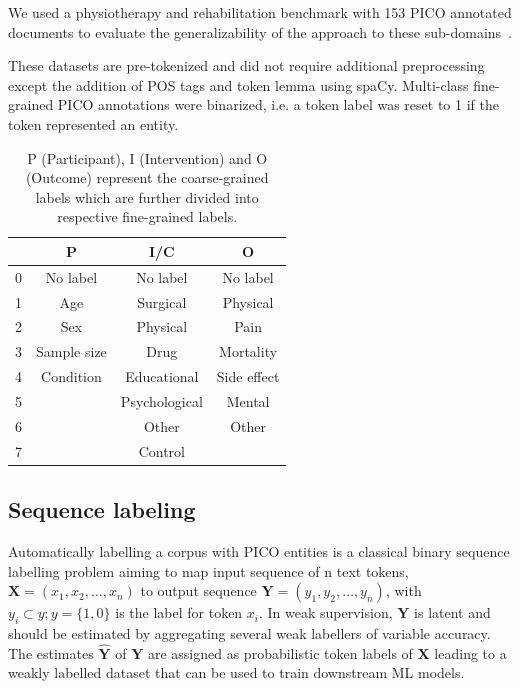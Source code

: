 \documentclass[10.7pt,]{article}
\begin{document}
We used a physiotherapy and rehabilitation benchmark with 153 PICO annotated documents to evaluate the generalizability of the approach to these sub-domains~\cite{dhrangadhariya2021end}.

These datasets are pre-tokenized and did not require additional preprocessing except the addition of POS tags and token lemma using spaCy.
Multi-class fine-grained PICO annotations were binarized, i.e. a token label was reset to 1 if the token represented an entity.
%
%
%
\begin{table}[h!]
\begin{center}
\begin{tabular}{| c | c | c | c |} 
\hline
 & P & I/C & O \\ 
\hline
0 & No label & No label & No label \\ 
1 & Age & Surgical & Physical \\ 
2 & Sex & Physical & Pain \\
3 & Sample size & Drug & Mortality \\
4 & Condition & Educational & Side effect \\
5 &  & Psychological & Mental \\
6 &  & Other & Other \\
7 &  & Control &  \\
\hline
\end{tabular}
\caption{\label{table:coarsefineconcept} P (Participant), I (Intervention) and O (Outcome) represent the coarse-grained labels which are further divided into respective fine-grained labels.}
\end{center}
\end{table}
%
%
%
\subsection{Sequence labeling}\label{seq_lab}
%
Automatically labelling a corpus with PICO entities is a classical binary sequence labelling problem aiming to map input sequence of n text tokens, $ \bm{X} = (x_{1}, x_{2}, \dotso , x_{n} )$ to output sequence $\bm{Y} = (y_{1}, y_{2}, \dotso , y_{n} )$, with $y_{i} \subset y; y = \{1,0\} $ is the label for token $x_{i}$.
In weak supervision, $\bm{Y}$ is latent and should be estimated by aggregating several weak labellers of variable accuracy.
The estimates $\bm{\hat{Y}}$ of $\bm{Y}$ are assigned as probabilistic token labels of $\bm{X}$ leading to a weakly labelled dataset that can be used to train downstream ML models.
\end{document}

